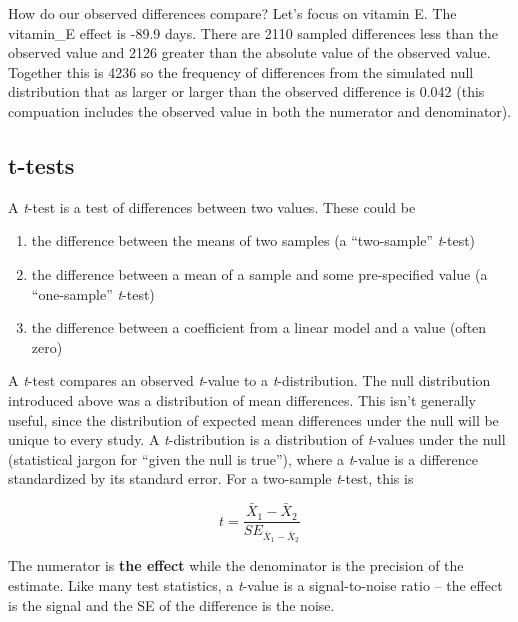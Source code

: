 \documentclass[]{book}
\providecommand{\tightlist}{%
  \setlength{\itemsep}{0pt}\setlength{\parskip}{0pt}}
\begin{document}
How do our observed differences compare? Let's focus on vitamin E. The
vitamin\_E effect is -89.9 days. There are 2110 sampled differences less
than the observed value and 2126 greater than the absolute value of the
observed value. Together this is 4236 so the frequency of differences
from the simulated null distribution that as larger or larger than the
observed difference is 0.042 (this compuation includes the observed
value in both the numerator and denominator).

\subsection{t-tests}\label{t-tests}

A \emph{t}-test is a test of differences between two values. These could
be

\begin{enumerate}
\def\labelenumi{\arabic{enumi}.}
\tightlist
\item
  the difference between the means of two samples (a ``two-sample''
  \emph{t}-test)
\item
  the difference between a mean of a sample and some pre-specified value
  (a ``one-sample'' \emph{t}-test)
\item
  the difference between a coefficient from a linear model and a value
  (often zero)
\end{enumerate}

A \emph{t}-test compares an observed \emph{t}-value to a
\emph{t}-distribution. The null distribution introduced above was a
distribution of mean differences. This isn't generally useful, since the
distribution of expected mean differences under the null will be unique
to every study. A \emph{t}-distribution is a distribution of
\emph{t}-values under the null (statistical jargon for ``given the null
is true''), where a \emph{t}-value is a difference standardized by its
standard error. For a two-sample \emph{t}-test, this is

\begin{equation}
t = \frac{\bar{X}_1 - \bar{X}_2}{SE_{\bar{X}_1 - \bar{X}_2}}
\end{equation}

The numerator is \textbf{the effect} while the denominator is the
precision of the estimate. Like many test statistics, a \emph{t}-value
is a signal-to-noise ratio -- the effect is the signal and the SE of the
difference is the noise.
\end{document}
